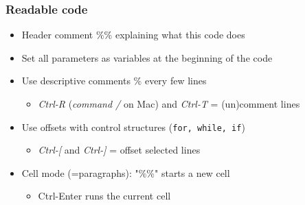 \documentclass[bigger]{beamer}
\begin{document}
\begin{frame}

\frametitle{Readable code}

\begin{itemize}
\item Header comment $\%\%$ explaining what this code does

\item Set all parameters as variables at the beginning of the code

\item Use descriptive comments $\%$ every few lines

\begin{itemize}
\item \emph{Ctrl-R} (\emph{command /} on Mac) and \emph{Ctrl-T} = (un)comment lines
\end{itemize}

\item Use offsets with control structures (\texttt{for, while, if})

\begin{itemize}
\item \emph{Ctrl-[} and \emph{Ctrl-]} = offset selected lines
\end{itemize}

\item Cell mode (=paragraphs): "\%\%" starts a new cell

\begin{itemize}
\item Ctrl-Enter runs the current cell
\end{itemize}
\end{itemize}

\end{frame}%
\end{document}
